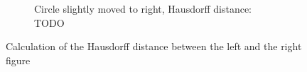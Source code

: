 \begin{figure}[H]
\begin{subfigure}{.5\textwidth}
        \caption{Circle slightly moved to right, Hausdorff distance: TODO}
    \end{subfigure}
    \caption{Calculation of the Hausdorff distance between the left and the right figure}
    \label{testnet_rise_max}
\end{figure}